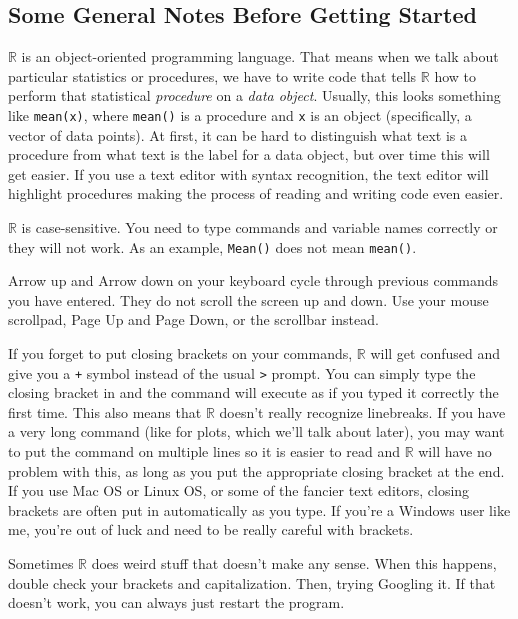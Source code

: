 \documentclass[12pt]{article}
\begin{document}
\subsection{Some General Notes Before Getting Started}
\begin{itemize*}
\item $\mathbb{R}$ is an object-oriented programming language. That means when we talk about particular statistics or procedures, we have to write code that tells $\mathbb{R}$ how to perform that statistical \emph{procedure} on a \emph{data object}. Usually, this looks something like \verb|mean(x)|, where \verb|mean()| is a procedure and \verb|x| is an object (specifically, a vector of data points). At first, it can be hard to distinguish what text is a procedure from what text is the label for a data object, but over time this will get easier. If you use a text editor with syntax recognition, the text editor will highlight procedures making the process of reading and writing code even easier.
\item $\mathbb{R}$ is case-sensitive. You need to type commands and variable names correctly or they will not work. As an example, \verb|Mean()| does not mean \verb|mean()|.
\item Arrow up and Arrow down on your keyboard cycle through previous commands you have entered. They do not scroll the screen up and down. Use your mouse scrollpad, Page Up and Page Down, or the scrollbar instead.
\item If you forget to put closing brackets on your commands, $\mathbb{R}$ will get confused and give you a \verb|+| symbol instead of the usual \verb|>| prompt. You can simply type the closing bracket in and the command will execute as if you typed it correctly the first time. This also means that $\mathbb{R}$ doesn't really recognize linebreaks. If you have a very long command (like for plots, which we'll talk about later), you may want to put the command on multiple lines so it is easier to read and $\mathbb{R}$ will have no problem with this, as long as you put the appropriate closing bracket at the end. If you use Mac OS or Linux OS, or some of the fancier text editors, closing brackets are often put in automatically as you type. If you're a Windows user like me, you're out of luck and need to be really careful with brackets.
\item Sometimes $\mathbb{R}$ does weird stuff that doesn't make any sense. When this happens, double check your brackets and capitalization. Then, trying Googling it. If that doesn't work, you can always just restart the program.
\end{itemize*}
\end{document}
